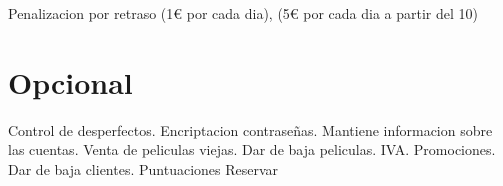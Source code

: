 \documentclass[12pt,a4paper,article]{memoir} %
\begin{document}
Penalizacion por retraso (1€ por cada dia), (5€ por cada dia a partir del 10)

\chapter{Opcional}
Control de desperfectos.
Encriptacion contraseñas.
Mantiene informacion sobre las cuentas.
Venta de peliculas viejas. Dar de baja peliculas.
IVA.
Promociones.
Dar de baja clientes.
Puntuaciones
Reservar

\end{document}

